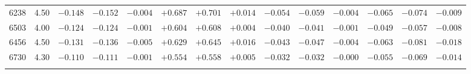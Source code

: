 \documentclass[]{aa}
\begin{document}
\begin{appendix}
\begin{table*}
\begin{center}
\begin{tabular}{llllllllllllll}
6238  &4.50& $ -0.148$&$  -0.152$&$  -0.004$&$  +0.687$&$  +0.701$&$  +0.014$&$  -0.054$&$  -0.059$&$  -0.004$&$  -0.065$&$-0.074$&$-0.009$\\
6503  &4.00& $ -0.124$&$  -0.124$&$  -0.001$&$  +0.604$&$  +0.608$&$  +0.004$&$  -0.040$&$  -0.041$&$  -0.001$&$  -0.049$&$-0.057$&$-0.008$\\
6456  &4.50& $ -0.131$&$  -0.136$&$  -0.005$&$  +0.629$&$  +0.645$&$  +0.016$&$  -0.043$&$  -0.047$&$  -0.004$&$  -0.063$&$-0.081$&$-0.018$\\
6730  &4.30& $ -0.110$&$  -0.111$&$  -0.001$&$  +0.554$&$  +0.558$&$  +0.005$&$  -0.032$&$  -0.032$&$  -0.000$&$  -0.055$&$-0.069$&$-0.014$\\
\hline\noalign{\smallskip}
\hline\noalign{\smallskip}
\end{tabular}
\end{center}
\end{table*}


\end{appendix}
\end{document}
